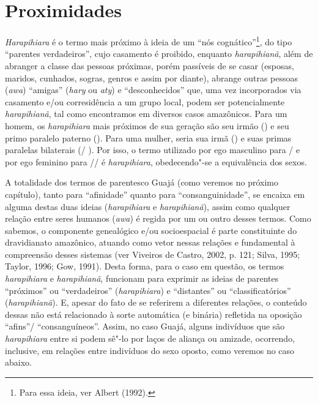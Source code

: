 \section{Proximidades}

\emph{Harapihiara} é o termo mais próximo à ideia de um ``nós
cognático''\footnote{Para essa ideia, ver Albert (1992).}, do tipo
``parentes verdadeiros'', cujo casamento é proibido, enquanto
\emph{harapihianã}, além de abranger a classe das pessoas próximas,
porém passíveis de se casar (esposas, maridos, cunhados, sogras, genros
e assim por diante), abrange outras pessoas (\emph{awa}) ``amigas''
(\emph{hary} ou \emph{aty}) e ``desconhecidos'' que, uma vez incorporados
via casamento e/ou corresidência a um grupo local, podem ser
potencialmente \emph{harapihianã}, tal como encontramos em diversos
casos amazônicos. Para um homem, os \emph{harapihiara} mais próximos de
sua geração são seu irmão () e seu primo paralelo paterno (). Para
uma mulher, seria sua irmã () e suas primas paralelas bilaterais (/
). Por isso, o termo utilizado por ego masculino para / e por ego
feminino para // é \emph{harapihiara}, obedecendo"-se a
equivalência dos sexos.

A totalidade dos termos de parentesco Guajá (como veremos no próximo
capítulo), tanto para ``afinidade'' quanto para ``consanguinidade'', se
encaixa em alguma destas duas ideias (\emph{harapihiara} e
\emph{harapihianã}), assim como qualquer relação entre seres humanos
(\emph{awa}) é regida por um ou outro desses termos. Como sabemos, o
componente genealógico e/ou socioespacial é parte constituinte do
dravidianato amazônico, atuando como vetor nessas relações e fundamental
à compreensão desses sistemas (ver Viveiros de Castro, 2002, p. 121;
Silva, 1995; Taylor, 1996; Gow, 1991). Desta forma, para o caso em
questão, os termos \emph{harapihiara} e \emph{harapihianã}, funcionam
para exprimir as ideias de parentes ``próximos'' ou ``verdadeiros''
(\emph{harapihiara}) e ``distantes'' ou ``classificatórios''
(\emph{harapihianã}). E, apesar do fato de se referirem a diferentes
relações, o conteúdo dessas não está relacionado à sorte automática (e
binária) refletida na oposição ``afins''/ ``consanguíneos''. Assim, no caso
Guajá, alguns indivíduos que são \emph{harapihiara} entre si podem sê"-lo
por laços de aliança ou amizade, ocorrendo, inclusive, em relações entre
indivíduos do sexo oposto, como veremos no caso abaixo.


